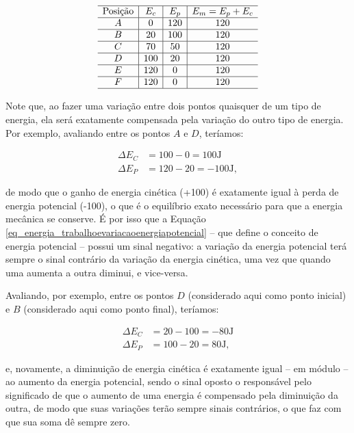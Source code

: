 \[
\begin{array}{c|c|c|c}
\hline
\text{Posição} & E_c & E_p & E_m = E_p + E_c \\
\hline
A & 0   & 120 & 120 \\
\hline
B & 20  & 100 & 120 \\
\hline
C & 70  & 50  & 120 \\
\hline
D & 100 & 20  & 120 \\
\hline
E & 120 & 0   & 120 \\
\hline
F & 120 & 0   & 120 \\
\hline
\end{array}
\]


Note que, ao fazer uma variação entre dois pontos quaisquer de um tipo de energia, ela será exatamente compensada pela variação do outro tipo de energia. Por exemplo, avaliando entre os pontos $A$ e $D$, teríamos:

\begin{align}
    \Delta E_C &= 100 - 0 = 100 \text{J} \nonumber \\
    \Delta E_P &= 120 - 20 = -100 \text{J}, \nonumber 
\end{align}


\noindent de modo que o ganho de energia cinética (+100) é exatamente igual à perda de energia potencial (-100), o que é o equilíbrio exato necessário para que a energia mecânica se conserve. É por isso que a Equação \eqref{eq_energia_trabalhoevariacaoenergiapotencial} -- que define o conceito de energia potencial -- possui um sinal negativo: a variação da energia potencial terá sempre o sinal contrário da variação da energia cinética, uma vez que quando uma aumenta a outra diminui, e vice-versa.

Avaliando, por exemplo, entre os pontos $D$ (considerado aqui como ponto inicial) e $B$ (considerado aqui como ponto final), teríamos:

\begin{align}
    \Delta E_C &= 20 - 100 = -80 \text{J} \nonumber \\
    \Delta E_P &= 100 - 20 = 80 \text{J}, \nonumber 
\end{align}

\noindent e, novamente, a diminuição de energia cinética é exatamente igual -- em módulo -- ao aumento da energia potencial, sendo o sinal oposto o responsável pelo significado de que o aumento de uma energia é compensado pela diminuição da outra, de modo que suas variações terão sempre sinais contrários, o que faz com que sua soma dê sempre zero.

